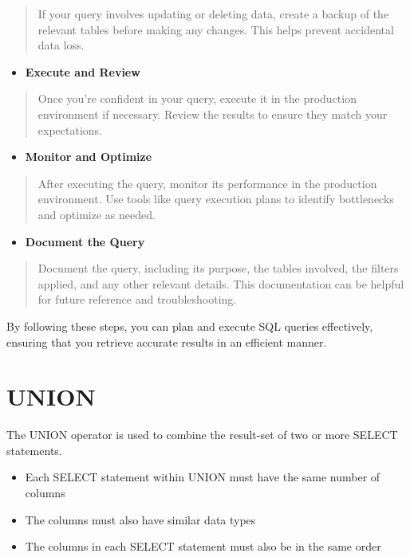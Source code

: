 \documentclass[
]{book}
\providecommand{\tightlist}{%
  \setlength{\itemsep}{0pt}\setlength{\parskip}{0pt}}
\begin{document}
\begin{quote}
If your query involves updating or deleting data, create a backup of the relevant tables before making any changes. This helps prevent accidental data loss.
\end{quote}

\begin{itemize}
\tightlist
\item
  \textbf{Execute and Review}
\end{itemize}

\begin{quote}
Once you're confident in your query, execute it in the production environment if necessary. Review the results to ensure they match your expectations.
\end{quote}

\begin{itemize}
\tightlist
\item
  \textbf{Monitor and Optimize}
\end{itemize}

\begin{quote}
After executing the query, monitor its performance in the production environment. Use tools like query execution plans to identify bottlenecks and optimize as needed.
\end{quote}

\begin{itemize}
\tightlist
\item
  \textbf{Document the Query}
\end{itemize}

\begin{quote}
Document the query, including its purpose, the tables involved, the filters applied, and any other relevant details. This documentation can be helpful for future reference and troubleshooting.
\end{quote}

By following these steps, you can plan and execute SQL queries effectively, ensuring that you retrieve accurate results in an efficient manner.

\hypertarget{union}{%
\section{UNION}\label{union}}

The UNION operator is used to combine the result-set of two or more SELECT statements.

\begin{itemize}
\tightlist
\item
  Each SELECT statement within UNION must have the same number of columns
\item
  The columns must also have similar data types
\item
  The columns in each SELECT statement must also be in the same order
\end{itemize}
\end{document}
